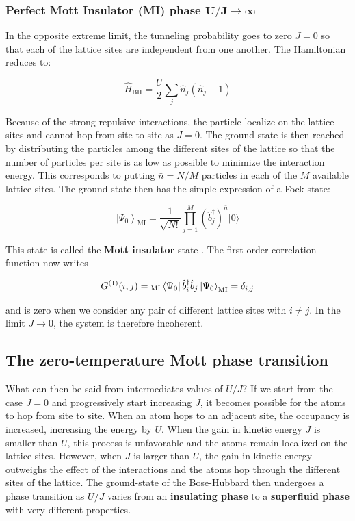 \subsubsection{Perfect Mott Insulator (MI) phase $\bm{U/J \to \infty}$}

In the opposite extreme limit, the tunneling probability goes to zero $J=0$ so that each of the lattice sites are independent from one another. The Hamiltonian reduces to:

\begin{equation}
    \hat{H}_{\mathrm{BH}} = \frac{U}{2} \sum_j \hat{n}_j (\hat{n}_j -1)
\end{equation}

Because of the strong repulsive interactions, the particle localize on the lattice sites and cannot hop from site to site as $J=0$. The ground-state is then reached by distributing the particles among the different sites of the lattice so that the number of particles per site is as low as possible to minimize the interaction energy. This corresponds to putting $\bar{n}=N/M$ particles in each of the $M$ available lattice sites. The ground-state then has the simple expression of a Fock state:

\begin{equation}
    \left|\Psi_{0}\right\rangle_{\mathrm{MI}}=\frac{1}{\sqrt{N !}} \prod_{j=1}^{M}\left(\hat{b}_{j}^{\dagger}\right)^{\bar{n}}|0\rangle
    \label{eq:ground-state_MI}
\end{equation}

\noindent This state is called the \textbf{Mott insulator} state \cite{fisher1989boson}. The first-order correlation function now writes

\begin{equation}
     G^{(1)}(i,j)= {}_{\mathrm{MI}} \bra{\Psi_0} \hat{b}^{\dagger}_i \hat{b}_j \ket{\Psi_0}_{\mathrm{MI}} = \delta_{i,j}
\end{equation}

\noindent and is zero when we consider any pair of different lattice sites with $i \neq j$. In the limit $J \to 0$, the system is therefore incoherent.

\subsection{The zero-temperature Mott phase transition}

What can then be said from intermediates values of $U/J$? If we start from the case $J=0$ and progressively start increasing $J$, it becomes possible for the atoms to hop from site to site. When an atom hops to an adjacent site, the occupancy is increased, increasing the energy by $U$. When the gain in kinetic energy $J$ is smaller than $U$, this process is unfavorable and the atoms remain localized on the lattice sites. However, when $J$ is larger than $U$, the gain in kinetic energy outweighs the effect of the interactions and the atoms hop through the different sites of the lattice. The ground-state of the Bose-Hubbard then undergoes a phase transition as $U/J$ varies from an \textbf{insulating phase} to a \textbf{superfluid phase} with very different properties.

